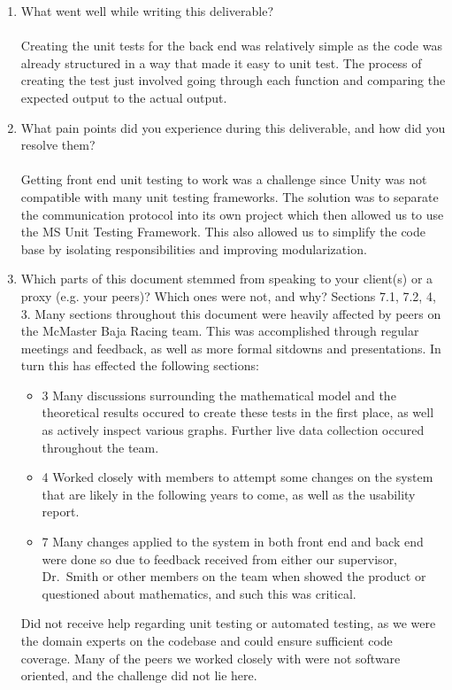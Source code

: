 \documentclass[12pt, titlepage]{article}
\begin{document}
\begin{enumerate}
  \item What went well while writing this deliverable?
  \\
  \\
  Creating the unit tests for the back end was relatively simple as the code was already structured in a way that made it easy to unit test.
  The process of creating the test just involved going through each function and comparing the expected output to the actual output.
  \item What pain points did you experience during this deliverable, and how
    did you resolve them?
  \\
  \\
  Getting front end unit testing to work was a challenge since Unity was not compatible with many unit testing frameworks.
  The solution was to separate the communication protocol into its own project which then allowed us to use the MS Unit Testing Framework.
  This also allowed us to simplify the code base by isolating responsibilities and improving modularization.
  \item Which parts of this document stemmed from speaking to your client(s) or
  a proxy (e.g. your peers)? Which ones were not, and why?
  Sections 7.1, 7.2, 4, 3. Many sections throughout this document were heavily affected by peers on the McMaster Baja Racing team. This was accomplished through regular meetings and feedback, as well as more formal sitdowns and presentations. In turn this has effected the following sections:
  \begin{itemize}
  \item{3} Many discussions surrounding the mathematical model and the theoretical results occured to create these tests in the first place, as well as actively inspect various graphs. Further live data collection occured throughout the team.
  \item{4} Worked closely with members to attempt some changes on the system that are likely in the following years to come, as well as the usability report.
  \item{7} Many changes applied to the system in both front end and back end were done so due to feedback received from either our supervisor, Dr.~Smith or other members on the team when showed the product or questioned about mathematics, and such this was critical.
  \end{itemize}

  Did not receive help regarding unit testing or automated testing, as we were the domain experts on the codebase and could ensure sufficient code coverage. Many of the peers we worked closely with were not software oriented, and the challenge did not lie here.


\end{enumerate}
\end{document}
